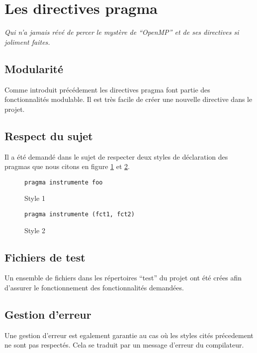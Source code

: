\section{Les directives pragma}

\emph{Qui n'a jamais révé de percer le mystère de ``OpenMP'' et de ses directives si joliment faites.}

\subsection{Modularité}

Comme introduit précédement les directives pragma font partie des fonctionnalités modulable. Il est très facile de créer une nouvelle directive dans le projet.

\subsection{Respect du sujet}

Il a été demandé dans le sujet de respecter deux styles de déclaration des pragmas que nous citons en figure \ref{fig:style1} et \ref{fig:style2}.

\begin{figure}[here]
  \centering
  \verb#pragma instrumente foo#
  \caption{Style 1}
  \label{fig:style1}
\end{figure}

\begin{figure}[here]
  \centering
  \verb#pragma instrumente (fct1, fct2)#
  \caption{Style 2}
  \label{fig:style2}
\end{figure}

\subsection{Fichiers de test}

Un ensemble de fichiers dans les répertoires ``test'' du projet ont été crées afin d'assurer le fonctionnement des fonctionnalités demandées.

\subsection{Gestion d'erreur}

Une gestion d'erreur est egalement garantie au cas où les styles cités précedement ne sont pas respectés. Cela se traduit par un message d'erreur du compilateur.
